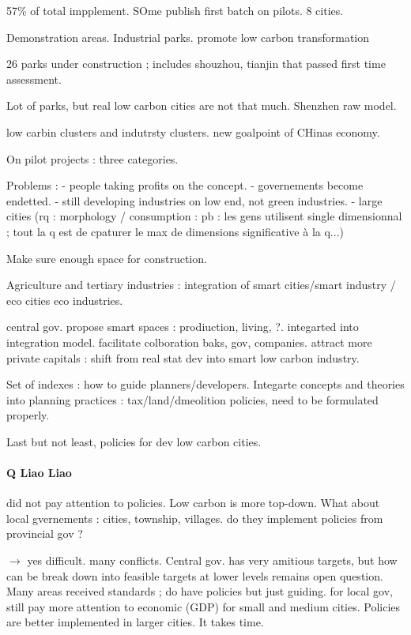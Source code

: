 57\% of total impplement. SOme publish first batch on pilots. 8 cities. 

Demonstration areas. Industrial parks. promote low carbon transformation

26 parks under construction ; includes shouzhou, tianjin that passed first time assessment.


Lot of parks, but real low carbon cities are not that much. Shenzhen raw model.

low carbin clusters and indutrsty clusters. new goalpoint of CHinas economy.

On pilot projects : three categories.

Problems :
 - people taking profits on the concept.
- governements become endetted.
- still developing industries on low end, not green industries.
- large cities
(rq : morphology / consumption : pb : les gens utilisent single dimensionnal ; tout la q est de cpaturer le max de dimensions significative à la q...)

Make sure enough space for construction.


Agriculture and tertiary industries : integration of smart cities/smart industry / eco cities eco industries.

central gov. propose smart spaces : prodiuction, living, ?. integarted into integration model. facilitate colboration baks, gov, companies. attract more private capitals : shift from real stat dev into smart low carbon industry.


Set of indexes : how to guide planners/developers. Integarte concepts and theories into planning practices : tax/land/dmeolition policies, need to be formulated properly.

Last but not least, policies for dev low carbon cities.

\paragraph{Q Liao Liao}

did not pay attention to policies. Low carbon is more top-down. What about local gvernements : cities, township, villages.
do they implement policies from provincial gov ?

$\rightarrow$ yes difficult. many conflicts. Central gov. has very amitious targets, but how can be break down into feasible targets at lower levels remains open question. Many areas received standards ; do have policies but just guiding. for local gov, still pay more attention to economic (GDP) for small and medium cities. Policies are better implemented in larger cities. It takes time.

